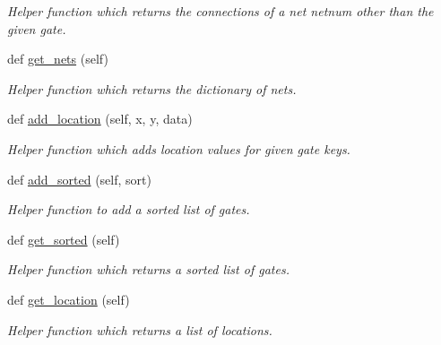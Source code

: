 \begin{DoxyCompactItemize}
\begin{DoxyCompactList}\small\item\em Helper function which returns the connections of a net \textquotesingle{}netnum\textquotesingle{} other than the given gate. \end{DoxyCompactList}\item 
def \hyperlink{classgqp__placer_1_1mothercore_aeea04940559af5cbcf30f508d6d89d19}{get\+\_\+nets} (self)\hypertarget{classgqp__placer_1_1mothercore_aeea04940559af5cbcf30f508d6d89d19}{}\label{classgqp__placer_1_1mothercore_aeea04940559af5cbcf30f508d6d89d19}

\begin{DoxyCompactList}\small\item\em Helper function which returns the dictionary of nets. \end{DoxyCompactList}\item 
def \hyperlink{classgqp__placer_1_1mothercore_a241bd6a3a70001d27965250630df7558}{add\+\_\+location} (self, x, y, data)\hypertarget{classgqp__placer_1_1mothercore_a241bd6a3a70001d27965250630df7558}{}\label{classgqp__placer_1_1mothercore_a241bd6a3a70001d27965250630df7558}

\begin{DoxyCompactList}\small\item\em Helper function which adds location values for given gate keys. \end{DoxyCompactList}\item 
def \hyperlink{classgqp__placer_1_1mothercore_a66c7983b80befa6e904a94e3e0621335}{add\+\_\+sorted} (self, sort)\hypertarget{classgqp__placer_1_1mothercore_a66c7983b80befa6e904a94e3e0621335}{}\label{classgqp__placer_1_1mothercore_a66c7983b80befa6e904a94e3e0621335}

\begin{DoxyCompactList}\small\item\em Helper function to add a sorted list of gates. \end{DoxyCompactList}\item 
def \hyperlink{classgqp__placer_1_1mothercore_a0b7370acc65d6940cc5e200bb53cae1e}{get\+\_\+sorted} (self)\hypertarget{classgqp__placer_1_1mothercore_a0b7370acc65d6940cc5e200bb53cae1e}{}\label{classgqp__placer_1_1mothercore_a0b7370acc65d6940cc5e200bb53cae1e}

\begin{DoxyCompactList}\small\item\em Helper function which returns a sorted list of gates. \end{DoxyCompactList}\item 
def \hyperlink{classgqp__placer_1_1mothercore_ae1782ee57912d541a5ea81111eb68db6}{get\+\_\+location} (self)\hypertarget{classgqp__placer_1_1mothercore_ae1782ee57912d541a5ea81111eb68db6}{}\label{classgqp__placer_1_1mothercore_ae1782ee57912d541a5ea81111eb68db6}

\begin{DoxyCompactList}\small\item\em Helper function which returns a list of locations. \end{DoxyCompactList}\end{DoxyCompactItemize}

